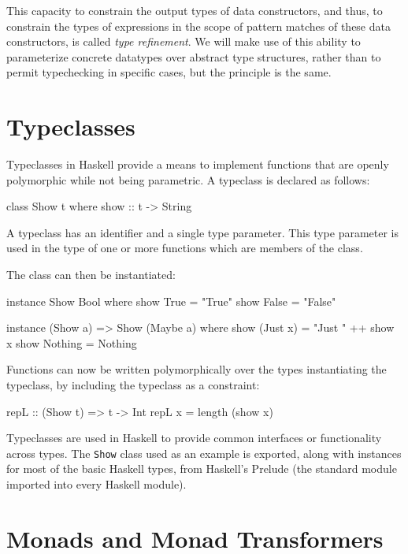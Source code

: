 This capacity to constrain the output types of data constructors, and thus, to
constrain the types of expressions in the scope of pattern matches of these data
constructors, is called {\em type refinement}. We will make use of this ability
to parameterize concrete datatypes over abstract type structures, rather than to
permit typechecking in specific cases, but the principle is the same.

\section{Typeclasses}
\label{section:Haskell_Concepts-Typeclasses}

Typeclasses in Haskell provide a means to implement functions that are openly
polymorphic while not being parametric. A typeclass is declared as follows:

\begin{code}
class Show t where
  show :: t -> String
\end{code}

A typeclass has an identifier and a single type parameter. This type parameter
is used in the type of one or more functions which are members of the class.

The class can then be instantiated:

\begin{code}
instance Show Bool where
  show True  = "True"
  show False = "False"

instance (Show a) => Show (Maybe a) where
  show (Just x) = "Just " ++ show x
  show Nothing  = Nothing
\end{code}

Functions can now be written polymorphically over the types instantiating the
typeclass, by including the typeclass as a constraint:

\begin{code}
repL :: (Show t) => t -> Int
repL x = length (show x)
\end{code}

Typeclasses are used in Haskell to provide common interfaces or functionality
across types. The {\tt Show} class used as an example is exported, along with
instances for most of the basic Haskell types, from Haskell's Prelude (the
standard module imported into every Haskell module). 

\section{Monads and Monad Transformers}
\label{section:Haskell_Concepts-Monads_and_Monad_Transformers}


